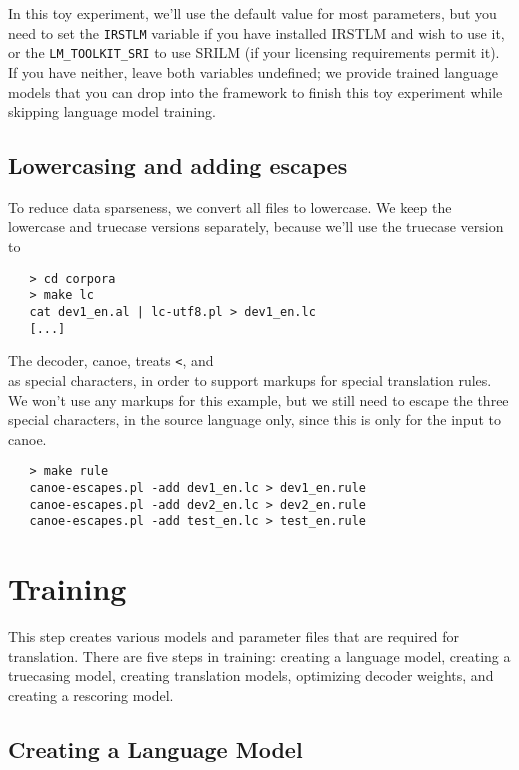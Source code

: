 \documentclass[11pt]{article}
\begin{document}
In this toy experiment, we'll use the default value for most parameters, but
you need to set the \texttt{IRSTLM} variable if you have installed IRSTLM and
wish to use it, or the \texttt{LM\_TOOLKIT\_SRI} to use SRILM (if your
licensing requirements permit it).  If you have neither, leave both variables
undefined; we provide trained language models that you can drop into the
framework to finish this toy experiment while skipping language model training.

\subsection{Lowercasing and adding escapes}

To reduce data sparseness, we convert all files to lowercase.  We keep the lowercase and truecase versions separately, because we'll use the truecase version to 
\begin{verbatim}
   > cd corpora
   > make lc
   cat dev1_en.al | lc-utf8.pl > dev1_en.lc
   [...]
\end{verbatim}

The decoder, canoe, treats \texttt{<}, \testtt{>} and \texttt{\\} as special
characters, in order to support markups for special translation rules.  We
won't use any markups for this example, but we still need to escape the three
special characters, in the source language only, since this is only for the
input to canoe.

\begin{verbatim}
   > make rule
   canoe-escapes.pl -add dev1_en.lc > dev1_en.rule
   canoe-escapes.pl -add dev2_en.lc > dev2_en.rule
   canoe-escapes.pl -add test_en.lc > test_en.rule
\end{verbatim}



\section{Training} \label{Training}

This step creates various models and parameter files that are required for
translation. There are five steps in training: creating a language model,
creating a truecasing model, creating translation models, optimizing decoder
weights, and creating a rescoring model.

\subsection{Creating a Language Model} \label{LM}
\end{document}
